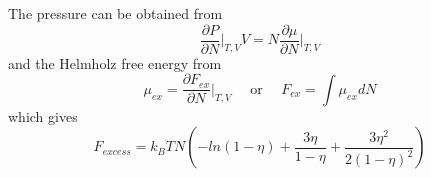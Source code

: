 \documentclass[12pt]{article}
\begin{document}
The pressure can be obtained from \color{red}
\begin{equation}{\frac{\partial{P}}{\partial{N}}\bigg|_{T,V}V=N\frac{\partial\mu}{\partial{N}}\bigg|_{T,V}}\end{equation} \color{black}
and the Helmholz free energy from
\begin{displaymath}\mu_{ex}=\frac{\partial{F_{ex}}}{\partial{N}}\bigg|_{T,V}{~~~~~~}\text{or}{~~~~~~}F_{ex}=\int{\mu_{ex}dN}\end{displaymath}
which gives
\begin{equation}F_{excess}=k_BTN\left(-ln(1-\eta)+\frac{3\eta}{1-\eta}+\frac{3{\eta}^2}{2(1-\eta)^2}\right)\end{equation} 




\cite{fake}



\end{document}
